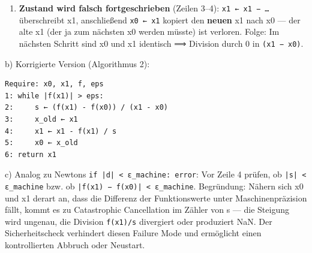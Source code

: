 \documentclass[11pt, a4paper]{article}
\begin{document}
\begin{enumerate}
  \item \textbf{Zustand wird falsch fortgeschrieben} (Zeilen 3–4): \texttt{x1 ← x1 − …} überschreibt x1, anschließend \texttt{x0 ← x1} kopiert den \textbf{neuen} x1 nach x0 — der alte x1 (der ja zum nächsten x0 werden müsste) ist verloren. Folge: Im nächsten Schritt sind x0 und x1 identisch ⟹ Division durch 0 in \texttt{(x1 − x0)}.
\end{enumerate}

b) Korrigierte Version (Algorithmus 2):

\begin{lstlisting}
Require: x0, x1, f, eps
1: while |f(x1)| > eps:
2:     s ← (f(x1) - f(x0)) / (x1 - x0)
3:     x_old ← x1
4:     x1 ← x1 - f(x1) / s
5:     x0 ← x_old
6: return x1
\end{lstlisting}


c) Analog zu Newtons \texttt{if |d| < ε\_machine: error}: Vor Zeile 4 prüfen, ob \texttt{|s| < ε\_machine} bzw. ob \texttt{|f(x1) − f(x0)| < ε\_machine}. Begründung: Nähern sich x0 und x1 derart an, dass die Differenz der Funktionswerte unter Maschinenpräzision fällt, kommt es zu Catastrophic Cancellation im Zähler von s — die Steigung wird ungenau, die Division \texttt{f(x1)/s} divergiert oder produziert NaN. Der Sicherheitscheck verhindert diesen Failure Mode und ermöglicht einen kontrollierten Abbruch oder Neustart.





\end{document}
